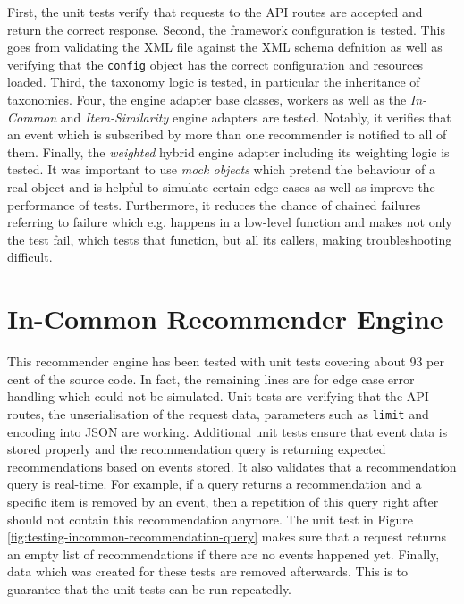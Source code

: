 First, the unit tests verify that requests to the API routes are accepted and return the correct response. Second, the framework configuration is tested. This goes from validating the XML file against the XML schema defnition as well as verifying that the \texttt{config} object has the correct configuration and resources loaded. Third, the taxonomy logic is tested, in particular the inheritance of taxonomies. Four, the engine adapter base classes, workers as well as the \emph{In-Common} and \emph{Item-Similarity} engine adapters are tested. Notably, it verifies that an event which is subscribed by more than one recommender is notified to all of them. Finally, the \emph{weighted} hybrid engine adapter including its weighting logic is tested. It was important to use \emph{mock objects} which pretend the behaviour of a real object and is helpful to simulate certain edge cases as well as improve the performance of tests. Furthermore, it reduces the chance of chained failures referring to failure which e.g. happens in a low-level function and makes not only the test fail, which tests that function, but all its callers, making troubleshooting difficult.

\section{In-Common Recommender Engine}

This recommender engine has been tested with unit tests covering about 93 per cent of the source code. In fact, the remaining lines are for edge case error handling which could not be simulated. Unit tests are verifying that the API routes, the unserialisation of the request data, parameters such as \texttt{limit} and encoding into JSON are working. Additional unit tests ensure that event data is stored properly and the recommendation query is returning expected recommendations based on events stored. It also validates that a recommendation query is real-time. For example, if a query returns a recommendation and a specific item is removed by an event, then a repetition of this query right after should not contain this recommendation anymore. The unit test in Figure \ref{fig:testing-incommon-recommendation-query} makes sure that a request returns an empty list of recommendations if there are no events happened yet. Finally, data which was created for these tests are removed afterwards. This is to guarantee that the unit tests can be run repeatedly.


